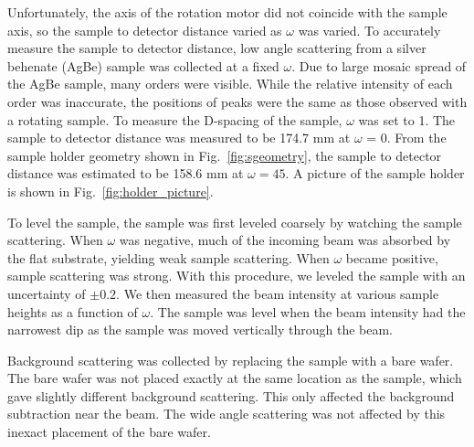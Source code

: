 Unfortunately,
the axis of the rotation motor did not coincide with the sample axis, so
the sample to detector distance varied as $\omega$ was varied. To accurately
measure the sample to detector distance, low angle scattering from a 
silver behenate (AgBe) sample was collected
at a fixed $\omega$. Due to large mosaic spread of the AgBe sample, many orders were
visible. While the relative intensity of each order was inaccurate, 
the positions of peaks were the same as those observed with a rotating sample.
To measure the D-spacing of the sample, $\omega$ was set to 1\textdegree.
The sample to detector distance was measured to be 174.7 mm 
at $\omega$ = 0\textdegree.
From the sample holder geometry shown in Fig.~\ref{fig:sgeometry},
the sample to detector distance was estimated to be 
158.6 mm at $\omega=45$\textdegree.
A picture of the sample holder is shown in Fig.~\ref{fig:holder_picture}.

To level the sample, 
the sample was first leveled coarsely by watching the sample scattering. When
$\omega$ was negative, much of the incoming beam was absorbed by the 
flat substrate, yielding weak sample scattering. When $\omega$ became 
positive, sample scattering was strong. With this procedure, 
we leveled the sample with an uncertainty of $\pm 0.2$\textdegree. We
then measured the beam intensity at various sample heights 
as a function of $\omega$. 
The sample was 
level when the beam intensity had the narrowest dip as the sample
was moved vertically through the beam.

Background scattering was collected by replacing the sample with a bare 
wafer. The bare wafer was not placed exactly at the same location
as the sample, which gave slightly different background scattering.
This only affected the background subtraction near the beam. 
The wide angle scattering was not affected by
this inexact placement of the bare wafer. 


